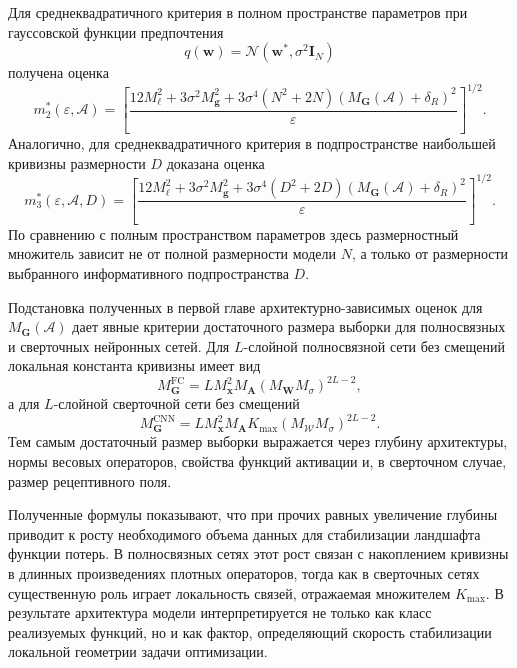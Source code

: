 Для среднеквадратичного критерия в полном пространстве параметров при гауссовской функции предпочтения
\begin{equation}
q(\mathbf w)=\mathcal N(\mathbf w^*, \sigma^2\mathbf I_N)
\end{equation}
получена оценка
\begin{equation}
m_2^*(\varepsilon, \mathcal A)
=
\left[
\frac{
12M_{\ell}^2
+
3\sigma^2M_{\mathbf g}^2
+
3\sigma^4(N^2+2N)\left(M_{\mathbf G}(\mathcal A)+\delta_R\right)^2
}{\varepsilon}
\right]^{1/2}.
\end{equation}
Аналогично, для среднеквадратичного критерия в подпространстве наибольшей кривизны размерности $D$ доказана оценка
\begin{equation}
m_3^*(\varepsilon, \mathcal A, D)
=
\left[
\frac{
12M_{\ell}^2
+
3\sigma^2M_{\mathbf g}^2
+
3\sigma^4(D^2+2D)\left(M_{\mathbf G}(\mathcal A)+\delta_R\right)^2
}{\varepsilon}
\right]^{1/2}.
\end{equation}
По сравнению с полным пространством параметров здесь размерностный множитель зависит не от полной размерности модели $N$, а только от размерности выбранного информативного подпространства $D$.

Подстановка полученных в первой главе архитектурно-зависимых оценок для $M_{\mathbf G}(\mathcal A)$ дает явные критерии достаточного размера выборки для полносвязных и сверточных нейронных сетей. Для $L$-слойной полносвязной сети без смещений локальная константа кривизны имеет вид
\begin{equation}
M_{\mathbf G}^{\mathrm{FC}}
=
L M_{\mathbf x}^2 M_{\mathbf A}(M_{\mathbf W}M_{\sigma})^{2L-2},
\end{equation}
а для $L$-слойной сверточной сети без смещений
\begin{equation}
M_{\mathbf G}^{\mathrm{CNN}}
=
L M_{\mathbf x}^2 M_{\mathbf A}K_{\max}(M_{\mathcal W}M_{\sigma})^{2L-2}.
\end{equation}
Тем самым достаточный размер выборки выражается через глубину архитектуры, нормы весовых операторов, свойства функций активации и, в сверточном случае, размер рецептивного поля.

Полученные формулы показывают, что при прочих равных увеличение глубины приводит к росту необходимого объема данных для стабилизации ландшафта функции потерь. В полносвязных сетях этот рост связан с накоплением кривизны в длинных произведениях плотных операторов, тогда как в сверточных сетях существенную роль играет локальность связей, отражаемая множителем $K_{\max}$. В результате архитектура модели интерпретируется не только как класс реализуемых функций, но и как фактор, определяющий скорость стабилизации локальной геометрии задачи оптимизации.

